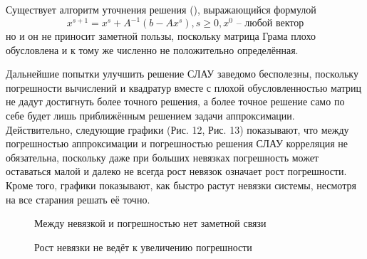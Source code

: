 ﻿\documentclass[a4paper, 12pt]{article}
\begin{document}
Существует алгоритм уточнения решения (\cite{algol}), выражающийся формулой
$$x^{s+1}=x^s+A^{-1}(b-Ax^s), s \geq 0, x^0 \text{ -- любой вектор}$$
но и он не приносит заметной пользы, поскольку матрица Грама плохо обусловлена и к тому же численно не положительно определённая.

Дальнейшие попытки улучшить решение СЛАУ заведомо бесполезны, поскольку погрешности вычислений и квадратур вместе с плохой обусловленностью матриц не дадут достигнуть более точного решения, а более точное решение само по себе будет лишь приближённым решением задачи аппроксимации. Действительно, следующие графики (Рис. 12, Рис. 13) показывают, что между погрешностью аппроксимации и погрешностью решения СЛАУ корреляция не обязательна, поскольку даже при больших невязках погрешность может оставаться малой и далеко не всегда рост невязок означает рост погрешности. Кроме того, графики показывают, как быстро растут невязки системы, несмотря на все старания решать её точно.

\begin{figure}[h!]
    \noindent{}
    \caption{Между невязкой и погрешностью нет заметной связи}
    \label{figCurves}
\end{figure}

\begin{figure}[h!]
    \noindent{}
   \caption{Рост невязки не ведёт к увеличению погрешности}
    \label{figCurves}
\end{figure}
\end{document}
